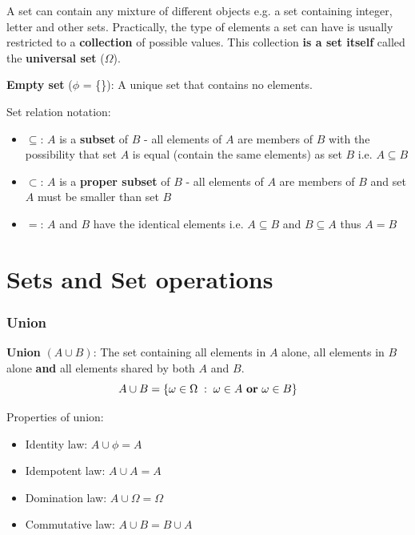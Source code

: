 \documentclass[10pt,a4paper]{article}
\begin{document}
A set can contain any mixture of different objects e.g. a set containing integer, letter and other
sets. Practically, the type of elements a set can have is usually restricted to a
\textbf{collection} of possible values. This collection \textbf{is a set itself} called the
\textbf{universal set} ($\Omega$).


\begin{tcolorbox}[breakable,colback=white]
\textbf{Empty set} ($\phi$ = \{\}): A unique set that contains no elements.
\end{tcolorbox}

Set relation notation:
\begin{itemize}
    \item $\subseteq$: $A$ is a \textbf{subset} of $B$ - all elements of $A$ are members of $B$ with the
    possibility that set $A$ is equal (contain the same elements) as set $B$ i.e. $A\subseteq B$
    \item $\subset$: $A$ is a \textbf{proper subset} of $B$ - all elements of $A$ are members of $B$
    and set $A$ must be smaller than set $B$
    \item $=$: $A$ and $B$ have the identical elements i.e. $A\subseteq B$ and $B \subseteq A$ thus $A=B$ 
\end{itemize}

\section{Sets and Set operations}
\subsubsection{Union}

\begin{tcolorbox}[breakable,colback=white]
\textbf{Union} $(A \cup B)$: The set containing all elements in $A$ alone, all elements in
$B$ alone \textbf{and} all elements shared by both $A$ and $B$.
$$
    A \cup B = \left\{\omega \in \Omega\; : \; \omega \in A \text{ \textbf{or} }\omega \in B\right\} 
$$
\end{tcolorbox}

Properties of union:
\begin{itemize}
    \item Identity law: $A\cup \phi = A$
    \item Idempotent law: $A \cup A = A$
    \item Domination law: $A \cup \Omega = \Omega$
    \item Commutative law: $A\cup B = B \cup A$
\end{itemize}
\end{document}
